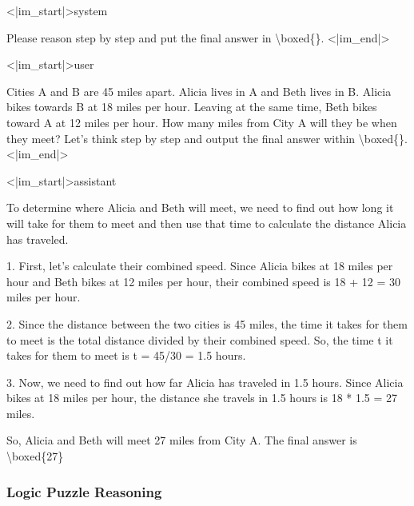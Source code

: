 \documentclass{article}
\theoremstyle{plain}
\theoremstyle{definition}
\theoremstyle{remark}
\begin{document}
\begin{tcolorbox}[
    colback=gray!5,
    colframe=gray!60,
    coltext=black,
    coltitle=white,
    title={Math Reasoning Example (Qwen2.5-Math-7B)},
    fonttitle=\small\bfseries,
    boxrule=0.4pt,
    arc=2mm,
    left=4pt, right=4pt, top=4pt, bottom=4pt
]

{\ttfamily\small <|im\_start|>system}

{\ttfamily\small Please reason step by step and put the final answer in \textbackslash boxed\{\}. <|im\_end|>}

{\ttfamily\small <|im\_start|>user}

{\ttfamily\small Cities A and B are 45 miles apart. Alicia lives in A and Beth lives in B. Alicia bikes towards B at 18 miles per hour. Leaving at the same time, Beth bikes toward A at 12 miles per hour. How many miles from City A will they be when they meet? Let's think step by step and output the final answer within \textbackslash boxed\{\}. <|im\_end|>}

{\ttfamily\small <|im\_start|>assistant}

{\ttfamily\small To determine where Alicia and Beth will meet, we need to find out how long it will take for them to meet and then use that time to calculate the distance Alicia has traveled.}

{\ttfamily\small 1. First, let's calculate their combined speed. Since Alicia bikes at 18 miles per hour and Beth bikes at 12 miles per hour, their combined speed is 18 + 12 = 30 miles per hour.}

{\ttfamily\small 2. Since the distance between the two cities is 45 miles, the time it takes for them to meet is the total distance divided by their combined speed. So, the time t it takes for them to meet is t = 45/30 = 1.5 hours.}

{\ttfamily\small 3. Now, we need to find out how far Alicia has traveled in 1.5 hours. Since Alicia bikes at 18 miles per hour, the distance she travels in 1.5 hours is 18 * 1.5 = 27 miles.}

{\ttfamily\small So, Alicia and Beth will meet 27 miles from City A. The final answer is \textbackslash boxed\{27\}}

\end{tcolorbox}

\subsubsection{Logic Puzzle Reasoning}
\end{document}
